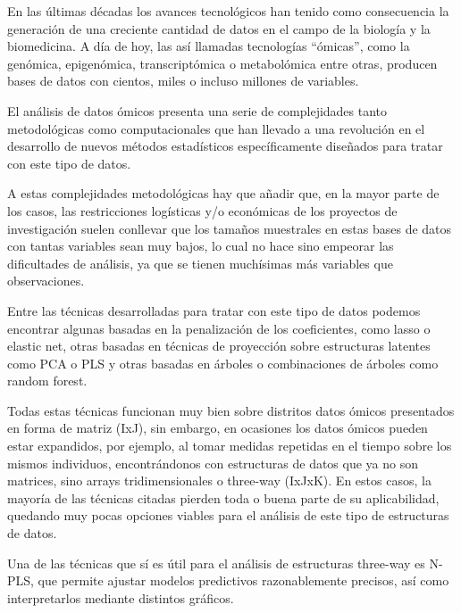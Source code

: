 
En las últimas décadas los avances tecnológicos han tenido como consecuencia la generación de una creciente cantidad de datos en el campo de la biología y la biomedicina. A día de hoy, las así llamadas tecnologías “ómicas”, como la genómica, epigenómica, transcriptómica o metabolómica entre otras, producen bases de datos con cientos, miles o incluso millones de variables. 

El análisis de datos ómicos presenta una serie de complejidades tanto metodológicas como computacionales que han llevado a una revolución en el desarrollo de nuevos métodos estadísticos específicamente diseñados para tratar con este tipo de datos. 

A estas complejidades metodológicas hay que añadir que, en la mayor parte de los casos, las restricciones logísticas y/o económicas de los proyectos de investigación suelen conllevar que los tamaños muestrales en estas bases de datos con tantas variables sean muy bajos, lo cual no hace sino empeorar las dificultades de análisis, ya que se tienen muchísimas más variables que observaciones.

Entre las técnicas desarrolladas para tratar con este tipo de datos podemos encontrar algunas basadas en la penalización de los coeficientes, como lasso o elastic net, otras basadas en técnicas de proyección sobre estructuras latentes como PCA o PLS y otras basadas en árboles o combinaciones de árboles como random forest.

Todas estas técnicas funcionan muy bien sobre distritos datos ómicos presentados en forma de matriz (IxJ), sin embargo, en ocasiones los datos ómicos pueden estar expandidos, por ejemplo, al tomar medidas repetidas en el tiempo sobre los mismos individuos, encontrándonos con estructuras de datos que ya no son matrices, sino arrays tridimensionales o three-way (IxJxK). En estos casos, la mayoría de las técnicas citadas pierden toda o buena parte de su aplicabilidad, quedando muy pocas opciones viables para el análisis de este tipo de estructuras de datos.

Una de las técnicas que sí es útil para el análisis de estructuras three-way es N-PLS, que permite ajustar modelos predictivos razonablemente precisos, así como interpretarlos mediante distintos gráficos.

